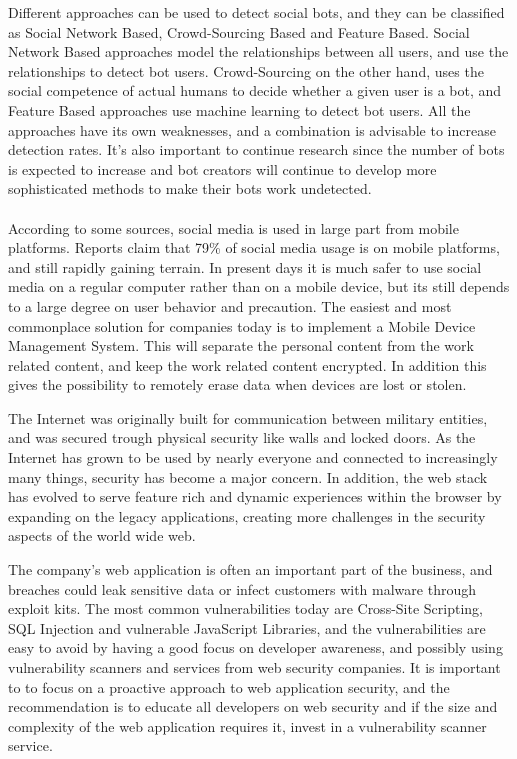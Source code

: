 Different approaches can be used to detect social bots, and they can be classified as Social Network Based, Crowd-Sourcing Based and Feature Based. Social Network Based approaches model the relationships between all users, and use the relationships to detect bot users. Crowd-Sourcing on the other hand, uses the social competence of actual humans to decide whether a given user is a bot, and Feature Based approaches use machine learning to detect bot users. All the approaches have its own weaknesses, and a combination is advisable to increase detection rates. It's also important to continue research since the number of bots is expected to increase and bot creators will continue to develop more sophisticated methods to make their bots work undetected.
\\ \\
According to some sources, social media is used in large part from mobile platforms. Reports claim that 79\% of social media usage is on mobile platforms, and still rapidly gaining terrain. In present days it is much safer to use social media on a regular computer rather than on a mobile device, but its still depends to a large degree on user behavior and precaution. The easiest and most commonplace solution for companies today is to implement a Mobile Device Management System. This will separate the personal content from the work related content, and keep the work related content encrypted. In addition this gives the possibility to remotely erase data when devices are lost or stolen.

The Internet was originally built for communication between military entities, and was secured trough physical security like walls and locked doors. As the Internet has grown to be used by nearly everyone and connected to increasingly many things, security has become a major concern. In addition, the web stack has evolved to serve feature rich and dynamic experiences within the browser by expanding on the legacy applications, creating more challenges in the security aspects of the world wide web.

The company's web application is often an important part of the business, and breaches could leak sensitive data or infect customers with malware through exploit kits. The most common vulnerabilities today are Cross-Site Scripting, SQL Injection and vulnerable JavaScript Libraries, and the vulnerabilities are easy to avoid by having a good focus on developer awareness, and possibly using vulnerability scanners and services from web security companies. It is important to to focus on a proactive approach to web application security, and the recommendation is to educate all developers on web security and if the size and complexity of the web application requires it, invest in a vulnerability scanner service.
        